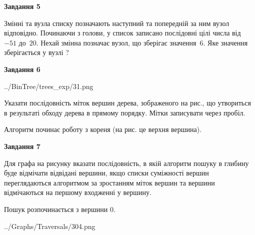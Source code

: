 \documentclass[12pt, ukrainian]{article}
\begin{document}
{\begin {large}
{\begin {center}\textbf{Завдання 5}\end {center}}\par
Змінні  та  вузла списку позначають наступний та попередній за ним вузол відповідно. Починаючи з голови, у список записано послідовні цілі числа від~$-51$ до~$20$. Нехай змінна  позначає вузол, що зберігає значення~$6$.
Яке значення зберігається у вузлі  ?\par
\newpage

{\begin {center}\textbf{Завдання 6}\end {center}}\par

\begin{center}
	{../BinTree/trees_exp/31.png}
\end{center}
Указати послідовність міток вершин дерева, зображеного на рис., що утвориться в результаті обходу дерева в прямому порядку. Мітки записувати через пробіл.\par Алгоритм починає роботу з кореня (на рис. це верхня вершина).\par
\newpage

{\begin {center}\textbf{Завдання 7}\end {center}}\par
Для графа на рисунку вказати послідовність, в якій алгоритм пошуку в глибину буде відмічати відвідані вершини, якщо списки суміжності вершин переглядаються алгоритмом за зростанням міток вершин та вершини відмічаються на першому вход\-женні у вершину.\par
Пошук розпочинається з вершини 0.\par

\begin{center}
	{../Graphs/Traversals/304.png}
\end{center}\par
\newpage


\end{large}}
\end{document}

